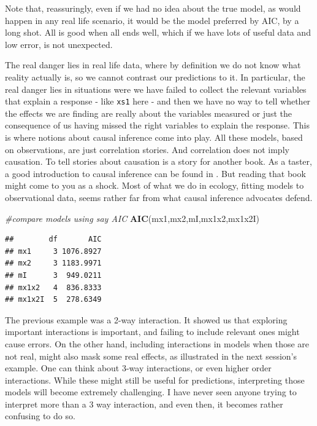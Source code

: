 \documentclass[
]{book}
\newenvironment{Shaded}{\begin{snugshade}}{\end{snugshade}}
\newcommand{\CommentTok}[1]{\textcolor[rgb]{0.56,0.35,0.01}{\textit{#1}}}
\newcommand{\FunctionTok}[1]{\textcolor[rgb]{0.13,0.29,0.53}{\textbf{#1}}}
\newcommand{\NormalTok}[1]{#1}
\begin{document}
Note that, reassuringly, even if we had no idea about the true model, as would happen in any real life scenario, it would be the model preferred by AIC, by a long shot. All is good when all ends well, which if we have lots of useful data and low error, is not unexpected.

The real danger lies in real life data, where by definition we do not know what reality actually is, so we cannot contrast our predictions to it. In particular, the real danger lies in situations were we have failed to collect the relevant variables that explain a response - like \texttt{xs1} here - and then we have no way to tell whether the effects we are finding are really about the variables measured or just the consequence of us having missed the right variables to explain the response. This is where notions about causal inference come into play. All these models, based on observations, are just correlation stories. And correlation does not imply causation. To tell stories about causation is a story for another book. As a taster, a good introduction to causal inference can be found in \citet{Hernan2020}. But reading that book might come to you as a shock. Most of what we do in ecology, fitting models to observational data, seems rather far from what causal inference advocates defend.

\begin{Shaded}
\begin{Highlighting}[]
\CommentTok{\#compare models using say AIC}
\FunctionTok{AIC}\NormalTok{(mx1,mx2,mI,mx1x2,mx1x2I)}
\end{Highlighting}
\end{Shaded}

\begin{verbatim}
##        df       AIC
## mx1     3 1076.8927
## mx2     3 1183.9971
## mI      3  949.0211
## mx1x2   4  836.8333
## mx1x2I  5  278.6349
\end{verbatim}

The previous example was a 2-way interaction. It showed us that exploring important interactions is important, and failing to include relevant ones might cause errors. On the other hand, including interactions in models when those are not real, might also mask some real effects, as illustrated in the next session's example. One can think about 3-way interactions, or even higher order interactions. While these might still be useful for predictions, interpreting those models will become extremely challenging. I have never seen anyone trying to interpret more than a 3 way interaction, and even then, it becomes rather confusing to do so.
\end{document}

